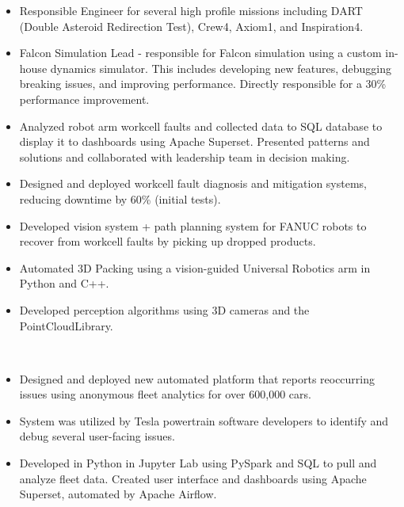     \begin{itemize}
        \item Responsible Engineer for several high profile missions including DART (Double Asteroid Redirection Test), Crew4, Axiom1, and Inspiration4.
        \item Falcon Simulation Lead - responsible for Falcon simulation using a custom in-house dynamics simulator. This includes developing new features, debugging breaking issues, and improving performance. Directly responsible for a 30\% performance improvement.
    \end{itemize}
\divider
{}
    \begin{itemize}
        \item Analyzed robot arm workcell faults and collected data to SQL database to display it to dashboards using Apache Superset. Presented patterns and solutions and collaborated with leadership team in decision making.
        \item Designed and deployed workcell fault diagnosis and mitigation systems, reducing downtime by 60\% (initial tests).
        \item Developed vision system + path planning system for FANUC robots to recover from workcell faults by picking up dropped products.
    \end{itemize}
\divider
{}
    \begin{itemize}
        \item Automated 3D Packing using a vision-guided Universal Robotics arm in Python and C++.
        \item Developed perception algorithms using 3D cameras and the PointCloudLibrary.
    \end{itemize}
\divider \\
    \begin{itemize}
        \item Designed and deployed new automated platform that reports reoccurring issues using anonymous fleet analytics for over 600,000 cars.
        \item System was utilized by Tesla powertrain software developers to identify and debug several user-facing issues.
        \item Developed in Python in Jupyter Lab using PySpark and SQL to pull and analyze fleet data. Created user interface and dashboards using Apache Superset, automated by Apache Airflow.
    \end{itemize}
